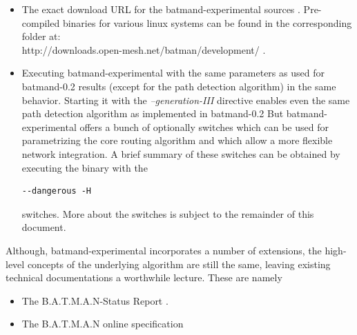 \documentclass[11pt]{article}
\begin{document}
\begin{itemize}
 \item The exact download URL for the batmand-experimental sources \cite{bmx-source-url}.
Pre-compiled binaries for various linux systems can be found in the corresponding folder at:\\ 
http://downloads.open-mesh.net/batman/development/ .


\item Executing batmand-experimental with the same parameters as used for batmand-0.2 results (except for the path detection algorithm) in the same behavior. 
%
Starting it with the \emph{--generation-III} directive enables even the same path detection algorithm as implemented in batmand-0.2
%
%
But batmand-experimental offers a bunch of optionally switches which can be used for parametrizing the core routing algorithm and which allow a more flexible network integration. A brief summary of these switches can be obtained by executing the binary with the 
%
\begin{small} 
\begin{verbatim} 
--dangerous -H
\end{verbatim} 
\end{small}
%
 switches. More about the switches is subject to the remainder of this document.



\end{itemize}
%
Although, batmand-experimental incorporates a number of extensions, the high-level concepts of the underlying algorithm are still the same, leaving existing technical documentations a worthwhile lecture. These are namely 
\begin{itemize}
 \item The B.A.T.M.A.N-Status Report \cite{batman-status-report}.
 \item The B.A.T.M.A.N online specification \cite{batman-specification-wiki}
\end{itemize}
\end{document}
